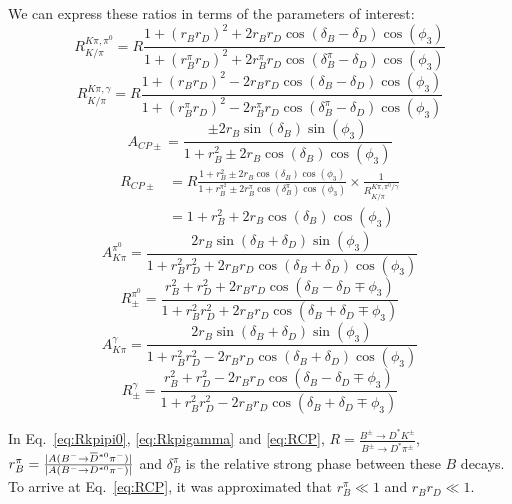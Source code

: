 \documentclass[oneside,12pt]{article}
\newcommand{\overbar}[1]{\mkern 1.5mu\overline{\mkern-1.5mu#1\mkern-1.5mu}\mkern
1.5mu}
\begin{document}
We can express these ratios in terms of the parameters of interest:
\begin{equation}
  R^{K\pi,
  \pi^0}_{K/\pi}=R\frac{1+(r_Br_D)^2+2r_Br_D\cos(\delta_B-\delta_D)\cos(\phi_3)}{1+(r_B^{\pi}r_D)^2+2r_B^{\pi}r_D\cos(\delta_B^{\pi}-\delta_D)\cos(\phi_3)}
  \label{eq:Rkpipi0}
\end{equation}
\begin{equation}
  R^{K\pi,
  \gamma}_{K/\pi}=R\frac{1+(r_Br_D)^2-2r_Br_D\cos(\delta_B-\delta_D)\cos(\phi_3)}{1+(r_B^{\pi}r_D)^2-2r_B^{\pi}r_D\cos(\delta_B^{\pi}-\delta_D)\cos(\phi_3)}
  \label{eq:Rkpigamma}
\end{equation}
\begin{equation}
  A_{CP\pm}=\frac{\pm 2r_{B}\sin(\delta_{B})\sin(\phi_{3})}{1+r_{B}^{2}\pm 2r_{B}\cos(\delta_{B})\cos(\phi_{3})}
  \label{eq:ACP}
\end{equation}
\begin{align}
  R_{CP\pm} &=R\frac{1 + r_{B}^{2} \pm 2r_{B}\cos(\delta_{B})\cos(\phi_{3})}{1 +
  r_{B}^{\pi^2} \pm 2r_{B}^{\pi}\cos(\delta_{B}^{\pi})\cos(\phi_{3})} \times
  \frac{1}{R^{K\pi,\pi^0 /\gamma}_{K/\pi}} \nonumber \\
  &= 1 + r_B^2 + 2r_B\cos(\delta_B)\cos(\phi_3) 
  \label{eq:RCP}
\end{align}
\begin{equation}
  A_{K\pi}^{\pi^{0}}=\frac{2r_{B}\sin(\delta_{B}+\delta_{D})\sin(\phi_{3})}{1+r_{B}^{2}r_{D}^{2}+2r_{B}r_{D}\cos(\delta_{B}+\delta_{D})\cos(\phi_{3})}
  \label{eq:AfavPi0}
\end{equation}
\begin{equation}
  R_{\pm}^{\pi^{0}}=\frac{r_{B}^{2} + r_{D}^{2} +
    2r_{B}r_{D}\cos(\delta_{B}-\delta_{D}\mp
  \phi_{3})}{1+r_{B}^{2}r_{D}^{2}+2r_{B}r_{D}\cos(\delta_{B}+\delta_{D}\mp
  \phi_{3})} \label{eq:RPlusMinusPi0}
\end{equation}
\begin{equation}
  A_{K\pi}^{\gamma}=\frac{2r_{B}\sin(\delta_{B}+\delta_{D})\sin(\phi_{3})}{1+r_{B}^{2}r_{D}^{2}-2r_{B}r_{D}\cos(\delta_{B}+\delta_{D})\cos(\phi_{3})}
  \label{eq:AfavGamma}
\end{equation}
\begin{equation}
  R_{\pm}^{\gamma}=\frac{r_{B}^{2} + r_{D}^{2} -
    2r_{B}r_{D}\cos(\delta_{B}-\delta_{D}\mp
  \phi_{3})}{1+r_{B}^{2}r_{D}^{2}-2r_{B}r_{D}\cos(\delta_{B}+\delta_{D}\mp
  \phi_{3})} \label{eq:RPlusMinusGamma}
\end{equation}

\noindent In Eq.~\eqref{eq:Rkpipi0}, \eqref{eq:Rkpigamma} and \eqref{eq:RCP},
$R=\frac{B^{\pm}\rightarrow D^* K^{\pm}}{B^{\pm}\rightarrow D^* \pi^{\pm}}$,
$r_B^{\pi}=\frac{|A(B^{-}\rightarrow
\overbar{D}^{*0}\pi^-)|}{|A(B^{-}\rightarrow {D}^{*0}\pi^-)|}$ and
$\delta_{B}^{\pi}$ is the relative strong phase between these $B$ decays. To
arrive at Eq.~\eqref{eq:RCP}, it was approximated that $r_B^{\pi}\ll 1$ and
$r_Br_D \ll 1$.
\end{document}
